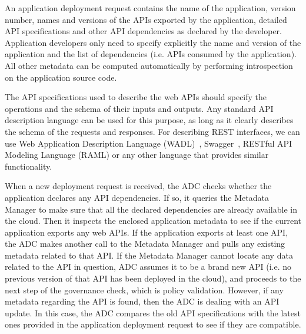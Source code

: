An application deployment request contains the name of the application,
version number, names and versions of the APIs exported by the application,
detailed API specifications and other API dependencies as declared by the
developer. Application developers only need to specify explicitly the name and
version of the application and the list of dependencies (i.e. APIs consumed by
the application). All other metadata can be computed automatically by
performing introspection on the application source code. 

The API specifications used to describe the web APIs should specify the
operations and the schema of their inputs and outputs.  Any standard API
description language can be used for this purpose, as long as it clearly
describes the schema of the requests and responses. For describing REST
interfaces, we can use Web Application Description Language (WADL)~\cite{hl:wadl}, Swagger~\cite{hl:swagger},
RESTful API Modeling Language (RAML) or any other language that provides similar functionality. %

When a new deployment request is received, the ADC checks whether the
application declares any API dependencies. If so, it queries the Metadata
Manager to make sure that all the declared dependencies are already available
in the cloud.  Then it inspects the enclosed application metadata to see if
the current application exports any web APIs. If the application exports at
least one API, the ADC makes another call to the Metadata Manager and pulls
any existing metadata related to that API. If the Metadata Manager cannot
locate any data related to the API in question, ADC assumes it to be a brand
new API (i.e. no previous version of that API has been deployed in the cloud),
and proceeds to the next step of the governance check, which is policy
validation. However, if any metadata regarding the API is found, then the ADC
is dealing with an API update. In this case, the ADC compares the old API
specifications with the latest ones provided in the application deployment
request to see if they are compatible.

